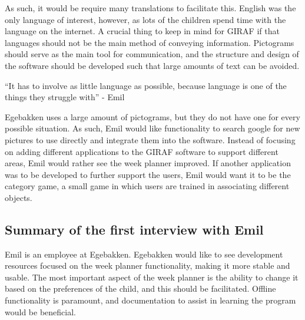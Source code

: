 As such, it would be require many translations to facilitate this.
English was the only language of interest, however, as lots of the children spend time with the language on the internet.
A crucial thing to keep in mind for GIRAF if that languages should not be the main method of conveying information. 
Pictograms should serve as the main tool for communication, and the structure and design of the software should be developed such that large amounts of text can be avoided.
\begin{displayquote}
    ``It has to involve as little language as possible, because language is one of the things they struggle with'' - Emil
\end{displayquote}
Egebakken uses a large amount of pictograms, but they do not have one for every possible situation.
As such, Emil would like functionality to search google for new pictures to use directly and integrate them into the software.
Instead of focusing on adding different applications to the GIRAF software to support different areas, Emil would rather see the week planner improved.
If another application was to be developed to further support the users, Emil would want it to be the category game, a small game in which users are trained in associating different objects.

\subsection{Summary of the first interview with Emil}
Emil is an employee at Egebakken.
Egebakken would like to see development resources focused on the week planner functionality, making it more stable and usable.
The most important aspect of the week planner is the ability to change it based on the preferences of the child, and this should be facilitated.
Offline functionality is paramount, and documentation to assist in learning the program would be beneficial.



